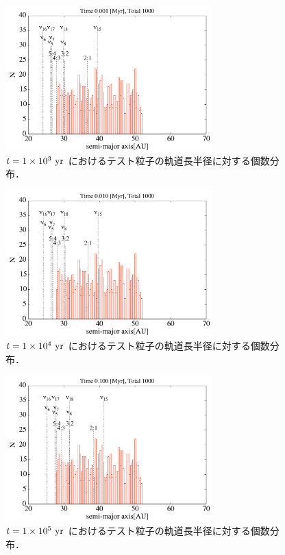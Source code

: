 \documentclass[11pt,a4paper,oneside,onecolumn]{jreport}
\begin{document}
\begin{figure}[H]
\centering
\includegraphics[width=8cm]{./image/kuiper_histogram_1kyr.pdf}
\caption{$t = 1 \times 10^3\ {\rm yr}$ におけるテスト粒子の軌道長半径に対する個数分布．\label{fig:kuiper_histogram_1kyr}}
\end{figure}

\begin{figure}[H]
\centering
\includegraphics[width=8cm]{./image/kuiper_histogram_10kyr.pdf}
\caption{$t = 1 \times 10^4\ {\rm yr}$ におけるテスト粒子の軌道長半径に対する個数分布．\label{fig:kuiper_histogram_10kyr}}
\end{figure}

\begin{figure}[H]
\centering
\includegraphics[width=8cm]{./image/kuiper_histogram_100kyr.pdf}
\caption{$t = 1 \times 10^5\ {\rm yr}$ におけるテスト粒子の軌道長半径に対する個数分布．\label{fig:kuiper_histogram_100kyr}}
\end{figure}
\end{document}
